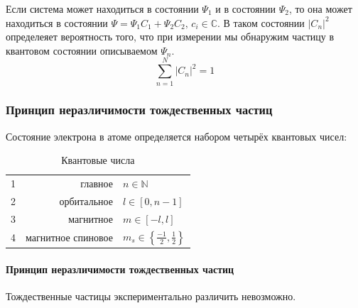 Если система может находиться в состоянии $\Psi_1$ и в состоянии $\Psi_2$, то она может находиться в состоянии $\Psi=\Psi_1C_1+\Psi_2C_2,\,c_i\in\mathbb{C}$. В таком состоянии $\left|C_n\right|^2$ определеяет вероятность того, что при измерении мы обнаружим частицу в квантовом состоянии описываемом $\Psi_n$.
\begin{equation*}
	\sum_{n=1}^{N} \left|C_n\right|^2 = 1
\end{equation*}

\subsubsection{Принцип неразличимости тождественных частиц}
Состояние электрона в атоме определяется набором четырёх квантовых чисел:
\begin{table}[H]
	\begin{center}
		\begin{tabular}{c|r|l}
			1 &            главное & $n\in\mathbb{N}$                                \\[5pt]
			2 &        орбитальное & $l\in[0,n-1]$                                   \\[5pt]
			3 &          магнитное & $m\in[-l,l]$                                    \\[5pt]
			4 & магнитное спиновое & $m_s\in\left\{\frac{-1}{2},\frac{1}{2}\right\}$ \\[5pt]
		\end{tabular}
	\end{center}
	\caption{Квантовые числа}
\end{table}
\paragraph{Принцип неразличимости тождественных частиц} Тождественные частицы экспериментально различить невозможно.
